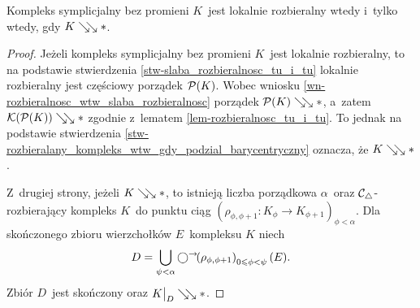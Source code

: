 \begin{stw}\label{stw-kompl_sympl_lokalnie_rozb_wtw_rozb}
Kompleks symplicjalny bez promieni $K$~jest lokalnie rozbieralny wtedy i~tylko wtedy, gdy $K\searrow\!\!\searrow *$.
\end{stw}
\begin{proof}
Jeżeli kompleks symplicjalny bez promieni $K$~jest lokalnie rozbieralny, to na podstawie stwierdzenia \ref{stw-slaba_rozbieralnosc_tu_i_tu} lokalnie rozbieralny jest częściowy porządek $\mathcal{P}(K)$. Wobec wniosku \ref{wn-rozbieralnosc_wtw_slaba_rozbieralnosc} porządek $\mathcal{P}(K)\searrow\!\!\searrow *$, a~zatem $\mathcal{K}(\mathcal{P}(K))\searrow\!\!\searrow *$ zgodnie z~lematem \ref{lem-rozbieralnosc_tu_i_tu}. To jednak na podstawie stwierdzenia \ref{stw-rozbieralany_kompleks_wtw_gdy_podzial_barycentryczny} oznacza, że $K\searrow\!\!\searrow *$.

Z~drugiej strony, jeżeli $K\searrow\!\!\searrow *$, to istnieją liczba porządkowa $\alpha$~oraz \mbox{$\mathcal{C}_\triangle$-rozbierający} kompleks $K$~do punktu ciąg $\left(\rho_{\phi,\phi+1}\colon K_\phi\to K_{\phi+1}\right)_{\phi<\alpha}$. Dla skończonego zbioru wierzchołków $E$~kompleksu $K$ niech \[D=\bigcup_{\psi<\alpha}\bigcirc^\rightarrow\!\!\left(\rho_{\phi,\phi+1}\right)_{0\leqslant\phi<\psi}(E).\] Zbiór $D$~jest skończony oraz $K\big|_D\searrow\!\!\searrow *$.
\end{proof}
\newpage\thispagestyle{empty}
